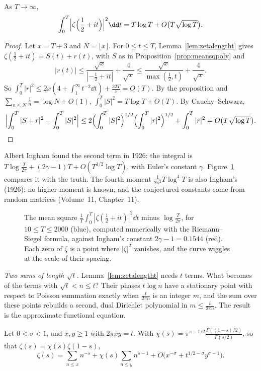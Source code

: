 \begin{theorem}\label{thm:hardylittlewood}
As $T\to\infty$,
\[
\int_0^T\Bigl|\zeta\Bigl(\frac12+it\Bigr)\Bigr|^2\dd t=T\log T+O\bigl(T\sqrt{\log T}\bigr).
\]
\end{theorem}
\begin{proof}
Let $x=T+3$ and $N=\lfloor x\rfloor$. For $0\le t\le T$, Lemma~\ref{lem:zetalengtht} gives $\zeta(\frac12+it)=S(t)+r(t)$, with $S$ as in Proposition~\ref{prop:meansqpoly} and
\[
|r(t)|\le\frac{\sqrt x}{|{-\frac12}+it|}+\frac4{\sqrt x}\le\frac{\sqrt x}{\max(\frac12,t)}+\frac4{\sqrt x}.
\]
So $\int_0^T|r|^2\le2x(4+\int_1^\infty t^{-2}\dd t)+\frac{32T}x=O(T)$. By the proposition and $\sum_{n\le N}\frac1n=\log N+O(1)$, $\int_0^T|S|^2=T\log T+O(T)$. By Cauchy--Schwarz,
\[
\Bigl|\int_0^T|S+r|^2-\int_0^T|S|^2\Bigr|\le2\Bigl(\int_0^T|S|^2\Bigr)^{1/2}\Bigl(\int_0^T|r|^2\Bigr)^{1/2}+\int_0^T|r|^2=O\bigl(T\sqrt{\log T}\bigr).
\]
\end{proof}

Albert Ingham found the second term in 1926: the integral is $T\log\frac T{2\pi}+(2\gamma-1)T+O(T^{1/2}\log T)$, with Euler's constant $\gamma$. Figure~\ref{fig:meansq} compares it with the truth. The fourth moment $\frac1{2\pi^2}T\log^4T$ is also Ingham's (1926); no higher moment is known, and the conjectured constants come from random matrices (Volume~11, Chapter~11).

\begin{figure}[ht]
\centering
{}
\caption{The mean square $\frac1T\int_0^T|\zeta(\frac12+it)|^2\dd t$ minus $\log\frac T{2\pi}$, for $10\le T\le2000$ (blue), computed numerically with the Riemann--Siegel formula, against Ingham's constant $2\gamma-1=0.1544$ (red). Each zero of $\zeta$ is a point where $|\zeta|^2$ vanishes, and the curve wiggles at the scale of their spacing.}
\label{fig:meansq}
\end{figure}

\emph{Two sums of length $\sqrt t$.} Lemma~\ref{lem:zetalengtht} needs $t$ terms. What becomes of the terms with $\sqrt t<n\le t$? Their phases $t\log n$ have a stationary point with respect to Poisson summation exactly when $\frac t{2\pi n}$ is an integer $m$, and the sum over these points rebuilds a second, dual Dirichlet polynomial in $m\le\frac t{2\pi n}$. The result is the approximate functional equation.

\begin{theorem}\label{thm:afe}
Let $0<\sigma<1$, and $x,y\ge1$ with $2\pi xy=t$. With $\chi(s)=\pi^{s-1/2}\frac{\Gamma((1-s)/2)}{\Gamma(s/2)}$, so that $\zeta(s)=\chi(s)\zeta(1-s)$,
\[
\zeta(s)=\sum_{n\le x}n^{-s}+\chi(s)\sum_{n\le y}n^{s-1}+O\bigl(x^{-\sigma}+t^{1/2-\sigma}y^{\sigma-1}\bigr).
\]
\end{theorem}

